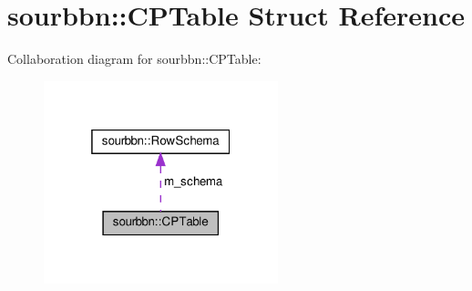 \hypertarget{structsourbbn_1_1CPTable}{}\section{sourbbn\+:\+:C\+P\+Table Struct Reference}
\label{structsourbbn_1_1CPTable}


Collaboration diagram for sourbbn\+:\+:C\+P\+Table\+:
\nopagebreak
\begin{figure}[H]
\begin{center}
\leavevmode
\includegraphics[width=193pt]{structsourbbn_1_1CPTable__coll__graph}
\end{center}
\end{figure}
